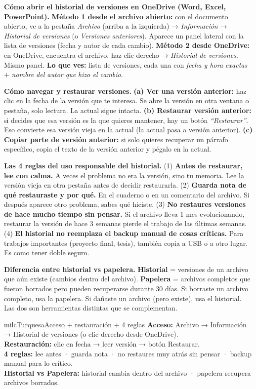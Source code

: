 \documentclass[11pt,letterpaper]{article}
\newcommand{\milcpaso}[3]{%
\Needspace{4\baselineskip}%
\begin{tcolorbox}[enhanced,colback=white,colframe=milcLinea,arc=1.5mm,boxrule=.9pt,
  left=14mm,right=4mm,top=3mm,bottom=3mm,before skip=4pt,after skip=4pt,
  fontupper=\RaggedRight,
  overlay={\node[anchor=north west,circle,fill=#2,text=white,inner sep=0pt,
    minimum size=7.4mm,font=\sffamily\bfseries\small]
    at ([xshift=3.6mm,yshift=-3.2mm]frame.north west) {#1};}]
#3
\end{tcolorbox}}
\begin{document}
\milcpaso{1}{milcTurquesa}{\textbf{Cómo abrir el historial de versiones en OneDrive (Word, Excel, PowerPoint).} \textbf{Método 1 desde el archivo abierto:} con el documento abierto, ve a la pestaña \emph{Archivo} (arriba a la izquierda) → \emph{Información} → \emph{Historial de versiones} (o \emph{Versiones anteriores}). Aparece un panel lateral con la lista de versiones (fecha y autor de cada cambio). \textbf{Método 2 desde OneDrive:} en OneDrive, encuentra el archivo, haz clic derecho → \emph{Historial de versiones}. Mismo panel. \textbf{Lo que ves:} lista de versiones, cada una con \emph{fecha y hora exactas} + \emph{nombre del autor que hizo el cambio}.}
\milcpaso{2}{milcTurquesa}{\textbf{Cómo navegar y restaurar versiones.} \textbf{(a) Ver una versión anterior:} haz clic en la fecha de la versión que te interesa. Se abre la versión en otra ventana o pestaña, solo lectura. La actual sigue intacta. \textbf{(b) Restaurar versión anterior:} si decides que esa versión es la que quieres mantener, hay un botón \emph{``Restaurar''}. Eso convierte esa versión vieja en la actual (la actual pasa a versión anterior). \textbf{(c) Copiar parte de versión anterior:} si solo quieres recuperar un párrafo específico, copia el texto de la versión anterior y pégalo en la actual.}
\milcpaso{3}{milcTurquesa}{\textbf{Las 4 reglas del uso responsable del historial.} (1) \textbf{Antes de restaurar, lee con calma.} A veces el problema no era la versión, sino tu memoria. Lee la versión vieja en otra pestaña antes de decidir restaurarla. (2) \textbf{Guarda nota de qué restauraste y por qué.} En el cuaderno o en un comentario del archivo. Si después aparece otro problema, sabes qué hiciste. (3) \textbf{No restaures versiones de hace mucho tiempo sin pensar.} Si el archivo lleva 1 mes evolucionando, restaurar la versión de hace 3 semanas pierde el trabajo de las últimas semanas. (4) \textbf{El historial no reemplaza el backup manual de cosas críticas.} Para trabajos importantes (proyecto final, tesis), también copia a USB o a otro lugar. Es como tener doble seguro.}
\milcpaso{4}{milcTurquesa}{\textbf{Diferencia entre historial vs papelera.} \textbf{Historial} = versiones de un archivo que aún existe (cambios dentro del archivo). \textbf{Papelera} = archivos completos que fueron borrados pero pueden recuperarse durante 30 días. Si borraste un archivo completo, usa la papelera. Si dañaste un archivo (pero existe), usa el historial. Las dos son herramientas distintas que se complementan.}

\begin{drawbox}{milcTurquesa}{Acceso + restauración + 4 reglas}
\textbf{Acceso:} Archivo → Información → Historial de versiones (o clic derecho desde OneDrive). \\[1mm]
\textbf{Restauración:} clic en fecha → leer versión → botón Restaurar. \\[1mm]
\textbf{4 reglas:} lee antes · guarda nota · no restaures muy atrás sin pensar · backup manual para lo crítico. \\[1mm]
\textbf{Historial vs Papelera:} historial cambia dentro del archivo · papelera recupera archivos borrados.
\end{drawbox}
\end{document}
